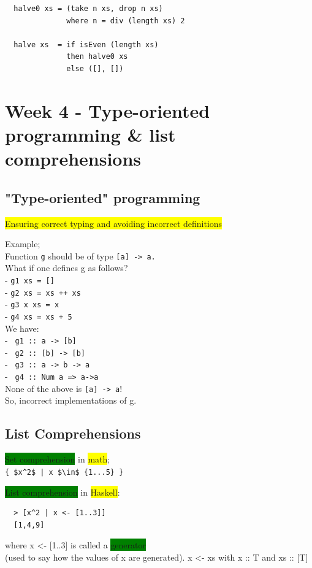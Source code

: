 \documentclass[tikz,border=10pt]{project_plan}
\begin{document}
\begin{lstlisting}
  halve0 xs = (take n xs, drop n xs)
              where n = div (length xs) 2

  halve xs  = if isEven (length xs)
              then halve0 xs
              else ([], [])
\end{lstlisting}

\chapter{Week 4 - Type-oriented programming \& list comprehensions}

\section{"Type-oriented" programming}

\colorbox{yellow}{Ensuring correct typing and avoiding incorrect definitions}

Example;\\
Function \lstinline|g| should be of type \lstinline|[a] -> a.|\\
What if one defines g as follows?\\
- \lstinline{g1 xs = []}\\
- \lstinline{g2 xs = xs ++ xs}\\
- \lstinline{g3 x xs = x}\\
- \lstinline{g4 xs = xs + 5}\\
We have:\\
- \lstinline{ g1 :: a -> [b]}\\
- \lstinline{ g2 :: [b] -> [b]}\\
- \lstinline{ g3 :: a -> b -> a}\\
- \lstinline{ g4 :: Num a => a->a}\\
None of the above is \lstinline{[a] -> a}!\\
So, incorrect implementations of g.

\section{List Comprehensions}

\colorbox{green}{Set comprehension} in \colorbox{yellow}{math};\\
\lstinline[mathescape],{ $x^2$ | x $\in$ {1...5} },

\colorbox{green}{List comprehension} in \colorbox{yellow}{Haskell}:
\begin{lstlisting}
  > [x^2 | x <- [1..3]]
  [1,4,9]
\end{lstlisting}
where x <- [1..3] is called a \colorbox{green}{generator}\\
(used to say how the values of x are generated).
x <- xs with x :: T and xs :: [T]\\
\end{document}
